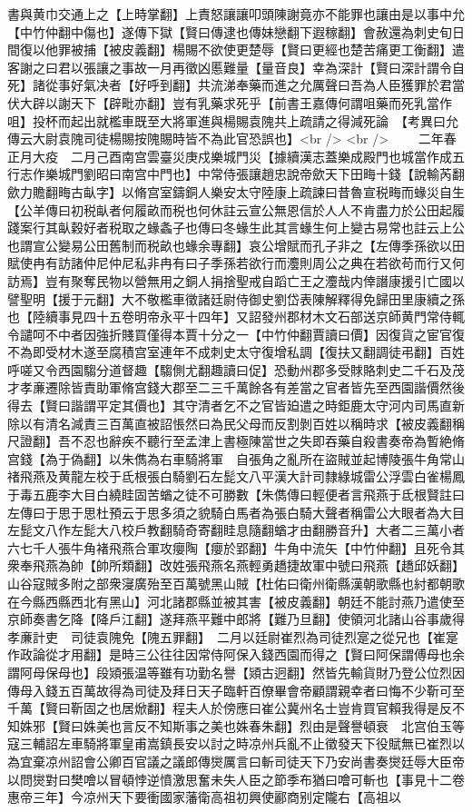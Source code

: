 書與黄巾交通上之【上時掌翻】上責怒讓讓叩頭陳謝竟亦不能罪也讓由是以事中允【中竹仲翻中傷也】遂傳下獄【賢曰傳逮也傳妹戀翻下遐稼翻】會赦還為刺史旬日間復以他罪被捕【被皮義翻】楊賜不欲使更楚辱【賢曰更經也楚苦痛更工衡翻】遣客謝之曰君以張讓之事故一月再徵凶慝難量【量音良】幸為深計【賢曰深計謂令自死】諸從事好氣决者【好呼到翻】共流涕奉藥而進之允厲聲曰吾為人臣獲罪於君當伏大辟以謝天下【辟毗亦翻】豈有乳藥求死乎【前書王嘉傳何謂咀藥而死乳當作咀】投杯而起出就檻車既至大將軍進與楊賜袁隗共上疏請之得減死論　【考異曰允傳云大尉袁隗司徒楊賜按隗賜時皆不為此官恐誤也】<br />
<br />
　　二年春正月大疫　二月己酉南宫雲臺災庚戍樂城門災【據續漢志蓋樂成殿門也城當作成五行志作樂城門劉昭曰南宫中門也】中常侍張讓趙忠說帝歛天下田畮十錢【說輸芮翻歛力贍翻畮古畒字】以脩宫室鑄銅人樂安太守陸康上疏諫曰昔魯宣税畮而蝝災自生【公羊傳曰初税畒者何履畝而税也何休註云宣公無恩信於人人不肯盡力於公田起履踐案行其畒穀好者税取之蝝螽子也傳曰冬蝝生此其言蝝生何上變古易常也註云上公也謂宣公變易公田舊制而税畝也蝝余專翻】哀公增賦而孔子非之【左傳季孫欲以田賦使冉有訪諸仲尼仲尼私非冉有曰子季孫若欲行而灋則周公之典在若欲苟而行又何訪焉】豈有聚奪民物以營無用之銅人捐捨聖戒自蹈亡王之灋哉内倖譖康援引亡國以譬聖明【援于元翻】大不敬檻車徵諸廷尉侍御史劉岱表陳解釋得免歸田里康續之孫也【陸續事見四十五卷明帝永平十四年】又詔發州郡材木文石部送京師黄門常侍輒令譴呵不中者因強折賤買僅得本賈十分之一【中竹仲翻賈讀曰價】因復貨之宦官復不為即受材木遂至腐積宫室連年不成刺史太守復增私調【復扶又翻調徒弔翻】百姓呼嗟又令西園騶分道督趣【騶側尤翻趣讀曰促】恐動州郡多受賕賂刺史二千石及茂才孝亷遷除皆責助軍脩宫錢大郡至二三千萬餘各有差當之官者皆先至西園諧價然後得去【賢曰諧謂平定其價也】其守清者乞不之官皆廹遣之時鉅鹿太守河内司馬直新除以有清名減責三百萬直被詔悵然曰為民父母而反割剝百姓以稱時求【被皮義翻稱尺證翻】吾不忍也辭疾不聽行至孟津上書極陳當世之失即吞藥自殺書奏帝為暫絶脩宫錢【為于偽翻】以朱儁為右車騎將軍　自張角之亂所在盜賊並起博陵張牛角常山禇飛燕及黄龍左校于氐根張白騎劉石左髭文八平漢大計司隸綠城雷公浮雲白雀楊鳳于毒五鹿李大目白繞眭固苦蝤之徒不可勝數【朱儁傳曰輕便者言飛燕于氐根賢註曰左傳曰于思于思杜預云于思多須之貌騎白馬者為張白騎大聲者稱雷公大眼者為大目左髭文八作左髭大八校戶教翻騎奇寄翻眭息隨翻蝤才由翻勝音升】大者二三萬小者六七千人張牛角褚飛燕合軍攻癭陶【癭於郢翻】牛角中流矢【中竹仲翻】且死令其衆奉飛燕為帥【帥所類翻】改姓張飛燕名燕輕勇趫捷故軍中號曰飛燕【趫邱妖翻】山谷寇賊多附之部衆寖廣殆至百萬號黑山賊【杜佑曰衛州衛縣漢朝歌縣也紂都朝歌在今縣西縣西北有黑山】河北諸郡縣並被其害【被皮義翻】朝廷不能討燕乃遣使至京師奏書乞降【降戶江翻】遂拜燕平難中郎將【難乃旦翻】使領河北諸山谷事歲得孝亷計吏　司徒袁隗免【隗五罪翻】　二月以廷尉崔烈為司徒烈寔之從兄也【崔寔作政論從才用翻】是時三公往往因常侍阿保入錢西園而得之【賢曰阿保謂傅母也余謂阿母保母也】段熲張温等雖有功勤名譽【熲古迥翻】然皆先輸貨財乃登公位烈因傳母入錢五百萬故得為司徒及拜日天子臨軒百僚畢會帝顧謂親幸者曰悔不少靳可至千萬【賢曰靳固之也居焮翻】程夫人於傍應曰崔公冀州名士豈肯買官賴我得是反不知姝邪【賢曰姝美也言反不知斯事之美也姝春朱翻】烈由是聲譽頓衰　北宫伯玉等寇三輔詔左車騎將軍皇甫嵩鎮長安以討之時凉州兵亂不止徵發天下役賦無已崔烈以為宜棄凉州詔會公卿百官議之議郎傳爕厲言曰斬司徒天下乃安尚書奏爕廷辱大臣帝以問爕對曰樊噲以冒頓悖逆憤激思奮未失人臣之節季布猶曰噲可斬也【事見十二卷惠帝三年】今凉州天下要衝國家藩衛高祖初興使酈商别定隴右【高祖以